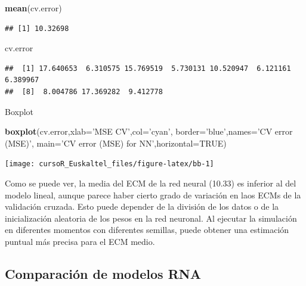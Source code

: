 \documentclass[]{book}
\newenvironment{Shaded}{\begin{snugshade}}{\end{snugshade}}
\newcommand{\KeywordTok}[1]{\textcolor[rgb]{0.13,0.29,0.53}{\textbf{#1}}}
\newcommand{\DataTypeTok}[1]{\textcolor[rgb]{0.13,0.29,0.53}{#1}}
\newcommand{\StringTok}[1]{\textcolor[rgb]{0.31,0.60,0.02}{#1}}
\newcommand{\OtherTok}[1]{\textcolor[rgb]{0.56,0.35,0.01}{#1}}
\newcommand{\NormalTok}[1]{#1}
\begin{document}
\begin{Shaded}
\begin{Highlighting}[]
\KeywordTok{mean}\NormalTok{(cv.error)}
\end{Highlighting}
\end{Shaded}

\begin{verbatim}
## [1] 10.32698
\end{verbatim}

\begin{Shaded}
\begin{Highlighting}[]
\NormalTok{cv.error}
\end{Highlighting}
\end{Shaded}

\begin{verbatim}
##  [1] 17.640653  6.310575 15.769519  5.730131 10.520947  6.121161  6.389967
##  [8]  8.004786 17.369282  9.412778
\end{verbatim}

Boxplot

\begin{Shaded}
\begin{Highlighting}[]
\KeywordTok{boxplot}\NormalTok{(cv.error,}\DataTypeTok{xlab=}\StringTok{'MSE CV'}\NormalTok{,}\DataTypeTok{col=}\StringTok{'cyan'}\NormalTok{,}
        \DataTypeTok{border=}\StringTok{'blue'}\NormalTok{,}\DataTypeTok{names=}\StringTok{'CV error (MSE)'}\NormalTok{,}
        \DataTypeTok{main=}\StringTok{'CV error (MSE) for NN'}\NormalTok{,}\DataTypeTok{horizontal=}\OtherTok{TRUE}\NormalTok{)}
\end{Highlighting}
\end{Shaded}

\begin{center}\texttt{[image: cursoR\_Euskaltel\_files/figure-latex/bb-1]} \end{center}

Como se puede ver, la media del ECM de la red neural (10.33) es inferior
al del modelo lineal, aunque parece haber cierto grado de variación en
laos ECMs de la validación cruzada. Esto puede depender de la división
de los datos o de la inicialización aleatoria de los pesos en la red
neuronal. Al ejecutar la simulación en diferentes momentos con
diferentes semillas, puede obtener una estimación puntual más precisa
para el ECM medio.

\subsection{Comparación de modelos
RNA}\label{comparacion-de-modelos-rna}
\end{document}
